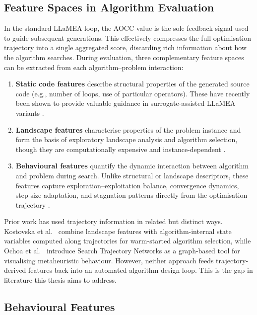 \documentclass[12pt]{article}
\begin{document}
\subsection{Feature Spaces in Algorithm Evaluation}

In the standard LLaMEA loop, the AOCC value is the sole feedback signal used to guide subsequent generations. This effectively compresses the full optimisation trajectory into a single aggregated score, discarding rich information about how the algorithm searches. During evaluation, three complementary feature spaces can be extracted from each algorithm--problem interaction:

\begin{enumerate}[leftmargin=2em]
  \item \textbf{Static code features} describe structural properties of the generated source code (e.g., number of loops, use of particular operators). These have recently been shown to provide valuable guidance in surrogate-assisted LLaMEA variants \cite{vanStein2026LLaMEASAGE}.
  \item \textbf{Landscape features} characterise properties of the problem instance and form the basis of exploratory landscape analysis and algorithm selection, though they are computationally expensive and instance-dependent \cite{cenikj2026features, smithmiles2009meta}.
  \item \textbf{Behavioural features} quantify the dynamic interaction between algorithm and problem during search. Unlike structural or landscape descriptors, these features capture exploration--exploitation balance, convergence dynamics, step-size adaptation, and stagnation patterns directly from the optimisation trajectory \cite{vanStein2025Behaviour}.
\end{enumerate}

Prior work has used trajectory information in related but distinct ways. Kostovska et al.\ \cite{kostovska2022trajectory} combine landscape features with algorithm-internal state variables computed along trajectories for warm-started algorithm selection, while Ochoa et al.\ \cite{ochoa2021stn} introduce Search Trajectory Networks as a graph-based tool for visualising metaheuristic behaviour. However, neither approach feeds trajectory-derived features back into an automated algorithm design loop. This is the gap in literature this thesis aims to address.

\subsection{Behavioural Features}
\end{document}
